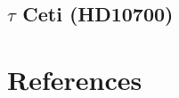 \subsection{$\tau$ Ceti (HD10700)}




\FloatBarrier

\section{References}
\label{\thesection}
\vspace{-1.5cm}


